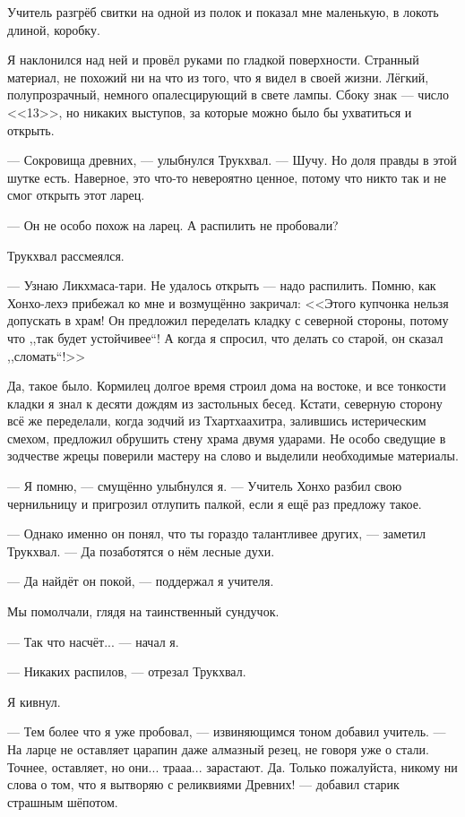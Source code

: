 Учитель разгрёб свитки на одной из полок и показал мне маленькую, в локоть длиной, коробку.

Я наклонился над ней и провёл руками по гладкой поверхности.
Странный материал, не похожий ни на что из того, что я видел в своей жизни.
Лёгкий, полупрозрачный, немного опалесцирующий в свете лампы.
Сбоку знак --- число <<13>>, но никаких выступов, за которые можно было бы ухватиться и открыть.

--- Сокровища древних, --- улыбнулся Трукхвал.
--- Шучу.
Но доля правды в этой шутке есть.
Наверное, это что-то невероятно ценное, потому что никто так и не смог открыть этот ларец.

--- Он не особо похож на ларец.
А распилить не пробовали?

Трукхвал рассмеялся.

--- Узнаю Ликхмаса-тари.
Не удалось открыть --- надо распилить.
Помню, как Хонхо-лехэ прибежал ко мне и возмущённо закричал: <<Этого купчонка нельзя допускать в храм!
Он предложил переделать кладку с северной стороны, потому что ,,так будет устойчивее``!
А когда я спросил, что делать со старой, он сказал ,,сломать``!>>

Да, такое было.
Кормилец долгое время строил дома на востоке, и все тонкости кладки я знал к десяти дождям из застольных бесед.
Кстати, северную сторону всё же переделали, когда зодчий из Тхартхаахитра, залившись истерическим смехом, предложил обрушить стену храма двумя ударами.
Не особо сведущие в зодчестве жрецы поверили мастеру на слово и выделили необходимые материалы.

--- Я помню, --- смущённо улыбнулся я.
--- Учитель Хонхо разбил свою чернильницу и пригрозил отлупить палкой, если я ещё раз предложу такое.

--- Однако именно он понял, что ты гораздо талантливее других, --- заметил Трукхвал.
--- Да позаботятся о нём лесные духи.

--- Да найдёт он покой, --- поддержал я учителя.

Мы помолчали, глядя на таинственный сундучок.

--- Так что насчёт... --- начал я.

--- Никаких распилов, --- отрезал Трукхвал.

Я кивнул.

--- Тем более что я уже пробовал, --- извиняющимся тоном добавил учитель.
--- На ларце не оставляет царапин даже алмазный резец, не говоря уже о стали.
Точнее, оставляет, но они... трааа... зарастают.
Да.
Только пожалуйста, никому ни слова о том, что я вытворяю с реликвиями Древних! --- добавил старик страшным шёпотом.

